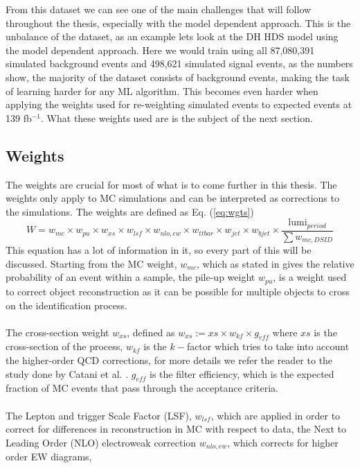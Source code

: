\documentclass[12pt, a4paper]{book}
\begin{document}
\newpage\noindent From this dataset we can see one of the main challenges that will follow throughout the thesis, especially with the model dependent approach. This is the unbalance of the dataset, as an example lets look at the DH HDS model using the model dependent approach. Here we would train using all 87,080,391 simulated background events and 498,621 simulated signal events, as the numbers 
show, the majority of the dataset consists of background events, making the task of learning harder for any ML algorithm. This becomes even harder when applying the weights used for re-weighting simulated events to expected events at 139 fb$^{-1}$. What these weights used are is the subject of the next section.

\subsection{Weights}\label{sec:wgts}
The weights are crucial for most of what is to come further in this thesis. The weights only apply to MC simulations and can be interpreted as corrections to the simulations. The weights are defined as Eq. (\ref{eq:wgts})
\begin{equation}\label{eq:wgts}
   W = w_{mc}\times w_{pu}\times w_{xs}\times w_{lsf} \times w_{nlo,ew} \times w_{ttbar} \times w_{jet} \times w_{bjet} \times \frac{\text{lumi}_{period}}{\sum w_{mc, DSID}}
\end{equation}
This equation has a lot of information in it, so every part of this will be discussed. Starting from the MC weight, $w_{mc}$, which as stated in \cite{Pythia} gives the relative probability of an event within a sample, the pile-up weight $w_{pu}$, is a weight used to correct object reconstruction as it can be possible for multiple objects to cross on the 
identification process. \cite{Soyez:2018opl}\\ 
\\The cross-section weight $w_{xs}$, defined as $w_{xs} := xs \times w_{kf} \times g_{eff}$ where $xs$ is the cross-section of the process, $w_{kf}$ is the $k-$factor which tries to take into account the higher-order QCD corrections, 
for more details we refer the reader to the study done by Catani et al. \cite{Catani:2001cr}. $g_{eff}$ is the filter efficiency, which is the expected fraction of MC events that pass through the acceptance criteria.\\
\\The Lepton and trigger Scale Factor (LSF), $w_{lsf}$, which are applied in order to correct for differences in reconstruction in MC with respect to data, the Next to Leading Order (NLO) electroweak correction $w_{nlo,ew}$, which corrects for higher order EW diagrams, 
\end{document}
